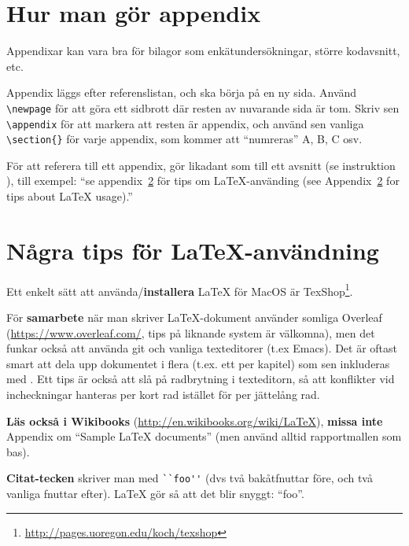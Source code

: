 
\section{Hur man gör appendix}
\label{app:appendix}
Appendixar kan vara bra för bilagor som enkätundersökningar, större kodavsnitt, etc. 

Appendix läggs efter referenslistan, och ska börja på en ny sida. Använd \verb|\newpage| för att göra ett sidbrott där resten av nuvarande sida är tom. Skriv sen \verb|\appendix| för att markera att resten är appendix, och 
 använd sen vanliga \verb|\section{}| för varje appendix, som kommer att ``numreras'' A, B, C osv.

För att referera till ett appendix, gör likadant som till ett avsnitt (se instruktion ), till exempel: ``se appendix~\ref{app:latex} för tips om La\TeX-använding (see Appendix~\ref{app:latex} for tips about La\TeX{} usage).''

\section{Några tips för La\TeX-användning}
\label{app:latex}

Ett enkelt sätt att använda/\textbf{installera} LaTeX för MacOS är TexShop\footnote{\url{http://pages.uoregon.edu/koch/texshop}}.

För \textbf{samarbete} när man skriver La\TeX-dokument använder somliga Overleaf (\url{https://www.overleaf.com/}, tips på liknande system är välkomna), men det funkar också att använda git och vanliga texteditorer (t.ex Emacs). Det är oftast smart att dela upp dokumentet i flera (t.ex. ett per kapitel) som sen inkluderas med \verb||. Ett tips är också att slå på radbrytning i texteditorn, så att konflikter vid incheckningar hanteras per kort rad istället för per jättelång rad.

\textbf{Läs också i Wikibooks} (\url{http://en.wikibooks.org/wiki/LaTeX}), \textbf{missa inte} Appendix om ``Sample LaTeX documents'' (men använd alltid rapportmallen som bas).

\textbf{Citat-tecken} skriver man med \verb|``foo''| (dvs två bakåtfnuttar före, och två vanliga fnuttar efter). LaTeX gör så att det blir snyggt: ``foo''.

